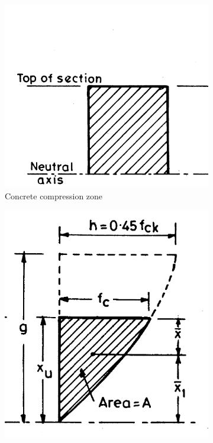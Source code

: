 \begin{figure}
\begin{subfigure}{0.3\textwidth}
\centering
\includegraphics[width=\textwidth]{images/compressiona.png}
\caption{Concrete compression zone}
\label{fig:compression}
\end{subfigure}
%
\begin{subfigure}{0.3\textwidth}
\centering
\includegraphics[width=\textwidth]{images/concretestressb.png}

\end{subfigure}
\end{figure}
